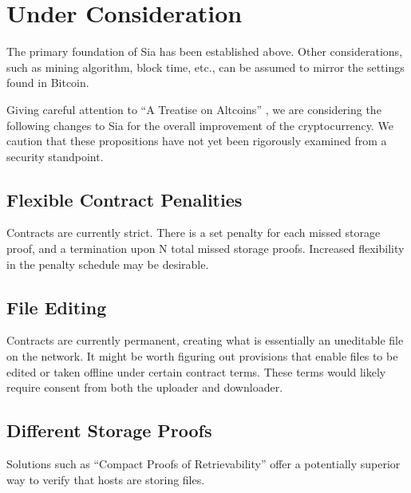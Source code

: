 \documentclass[twocolumn]{article}
\begin{document}

\section{Under Consideration}
The primary foundation of Sia has been established above.
Other considerations, such as mining algorithm, block time, etc., can be assumed to mirror the settings found in Bitcoin.

Giving careful attention to ``A Treatise on Altcoins'' \cite{alts}, we are considering the following changes to Sia for the overall improvement of the cryptocurrency.
We caution that these propositions have not yet been rigorously examined from a security standpoint.

\subsection{Flexible Contract Penalities}
Contracts are currently strict.
There is a set penalty for each missed storage proof, and a termination upon N total missed storage proofs.
Increased flexibility in the penalty schedule may be desirable.

\subsection{File Editing}
Contracts are currently permanent, creating what is essentially an uneditable file on the network.
It might be worth figuring out provisions that enable files to be edited or taken offline under certain contract terms.
These terms would likely require consent from both the uploader and downloader.

\subsection{Different Storage Proofs}
Solutions such as ``Compact Proofs of Retrievability'' \cite{cpr} offer a potentially superior way to verify that hosts are storing files.
\end{document}
